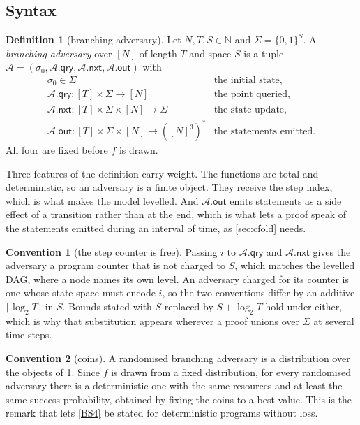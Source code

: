 \documentclass[11pt]{article}
\theoremstyle{plain}
\theoremstyle{definition}
\newtheorem{definition}{Definition}
\newtheorem{convention}{Convention}
\newcommand{\NN}{[N]}
\newcommand{\advers}{\mathcal{A}}
\newcommand{\qry}{\mathsf{qry}}
\newcommand{\nxt}{\mathsf{nxt}}
\newcommand{\outp}{\mathsf{out}}
\begin{document}
\subsection{Syntax}\label{app:syntax}

\begin{definition}[branching adversary]\label{d:adv}
Let $N,T,S \in \mathbb{N}$ and $\Sigma = \{0,1\}^{S}$.  A \emph{branching
adversary} over $\NN$ of length $T$ and space $S$ is a tuple
$\advers = (\sigma_{0}, \advers.\qry, \advers.\nxt, \advers.\outp)$ with
\[
  \begin{array}{ll}
  \sigma_{0} \in \Sigma
    & \text{the initial state},\\
  \advers.\qry \colon [T] \times \Sigma \to \NN
    & \text{the point queried},\\
  \advers.\nxt \colon [T] \times \Sigma \times \NN \to \Sigma
    & \text{the state update},\\
  \advers.\outp \colon [T] \times \Sigma \times \NN \to (\NN^{3})^{*}
    & \text{the statements emitted}.
  \end{array}
\]
All four are fixed before $f$ is drawn.
\end{definition}

Three features of the definition carry weight.  The functions are total and
deterministic, so an adversary is a finite object.  They receive the step
index, which is what makes the model levelled.  And $\advers.\outp$ emits
statements as a side effect of a transition rather than at the end, which is
what lets a proof speak of the statements emitted during an interval of
time, as \cref{sec:cfold} needs.

\begin{convention}[the step counter is free]\label{c:counter}
Passing $i$ to $\advers.\qry$ and $\advers.\nxt$ gives the adversary a
program counter that is not charged to $S$, which matches the levelled DAG,
where a node names its own level.  An adversary charged for its counter is
one whose state space must encode $i$, so the two conventions differ by an
additive $\lceil\log_{2}T\rceil$ in $S$.  Bounds stated with $S$ replaced by
$S + \log_{2}T$ hold under either, which is why that substitution appears
wherever a proof unions over $\Sigma$ at several time steps.
\end{convention}

\begin{convention}[coins]\label{c:coins}
A randomised branching adversary is a distribution over the objects of
\cref{d:adv}.  Since $f$ is drawn from a fixed distribution, for every
randomised adversary there is a deterministic one with the same resources
and at least the same success probability, obtained by fixing the coins to a
best value.  This is the remark that lets \cref{BS4} be stated for
deterministic programs without loss.
\end{convention}
\end{document}
